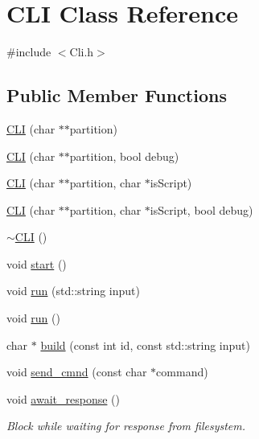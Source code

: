 \hypertarget{class_c_l_i}{}\section{C\+LI Class Reference}
\label{class_c_l_i}


{\ttfamily \#include $<$Cli.\+h$>$}

\subsection*{Public Member Functions}
\begin{DoxyCompactItemize}
\item 
\mbox{\hyperlink{class_c_l_i_a0c3b5662a3f33b5a76021be177c3eef2}{C\+LI}} (char $\ast$$\ast$partition)
\item 
\mbox{\hyperlink{class_c_l_i_aeafaa56f2b2d8c97121ed52125e3fa9a}{C\+LI}} (char $\ast$$\ast$partition, bool debug)
\item 
\mbox{\hyperlink{class_c_l_i_a4eb5e9a1c695edf4dcc705b9c12a0a8d}{C\+LI}} (char $\ast$$\ast$partition, char $\ast$is\+Script)
\item 
\mbox{\hyperlink{class_c_l_i_a5d9746160fc642addd9b4aff6cc4eef2}{C\+LI}} (char $\ast$$\ast$partition, char $\ast$is\+Script, bool debug)
\item 
\mbox{\hyperlink{class_c_l_i_a9f59d57abf434f7161fcf3f61b725752}{$\sim$\+C\+LI}} ()
\item 
void \mbox{\hyperlink{class_c_l_i_a1492005f186392031bd4d447cb20e975}{start}} ()
\item 
void \mbox{\hyperlink{class_c_l_i_a5ce3ce0818fc0afe2a277995000ea22b}{run}} (std\+::string input)
\item 
void \mbox{\hyperlink{class_c_l_i_aeefc8cd81999836a90c2cfaced6177f1}{run}} ()
\item 
char $\ast$ \mbox{\hyperlink{class_c_l_i_a6c3f97b04646b070ad82801adf0dc521}{build}} (const int id, const std\+::string input)
\item 
void \mbox{\hyperlink{class_c_l_i_a1d25fcb18cf42e03a7e38c24a8ba1506}{send\+\_\+cmnd}} (const char $\ast$command)
\item 
void \mbox{\hyperlink{class_c_l_i_a87c68e5edcb5750d1199839e6b1f843e}{await\+\_\+response}} ()
\begin{DoxyCompactList}\small\item\em Block while waiting for response from filesystem. \end{DoxyCompactList}\end{DoxyCompactItemize}
